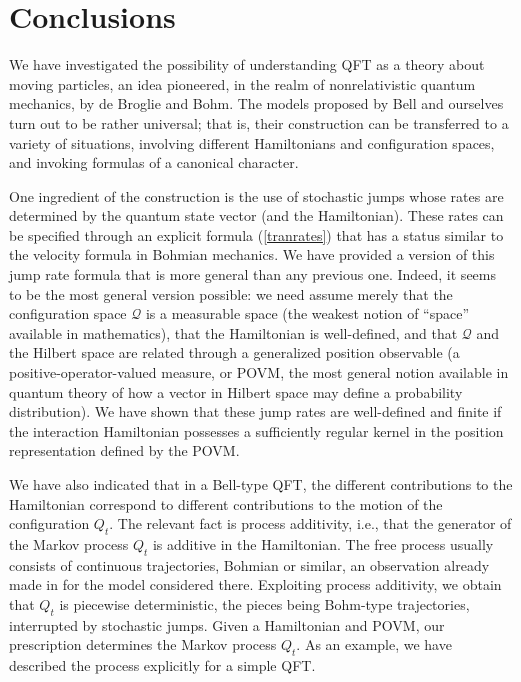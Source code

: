 \documentclass[12pt]{article}
\newcommand{\1}{\mathbf{1}} %
\newcommand{\conf}{\mathcal{Q}} %
\begin{document}
\section{Conclusions}

We have investigated the possibility of understanding QFT as a theory
about moving particles, an idea pioneered, in the realm of
nonrelativistic quantum mechanics, by de Broglie and Bohm. The models
proposed by Bell \cite{BellBeables} and ourselves \cite{crea1} turn
out to be rather universal; that is, their construction can be
transferred to a variety of situations, involving different
Hamiltonians and configuration spaces, and invoking formulas of a
canonical character.

One ingredient of the construction is the use of stochastic jumps
whose rates are determined by the quantum state vector (and the
Hamiltonian).  These rates can be specified through an explicit
formula (\ref{tranrates}) that has a status similar to the velocity
formula in Bohmian mechanics.  We have provided a version of this jump
rate formula that is more general than any previous one. Indeed, it
seems to be the most general version possible: we need assume merely
that the configuration space $\conf$ is a measurable space (the
weakest notion of ``space'' available in mathematics), that the
Hamiltonian is well-defined, and that $\conf$ and the Hilbert space
are related through a generalized position observable (a
positive-operator-valued measure, or POVM, the most general notion
available in quantum theory of how a vector in Hilbert space may
define a probability distribution). We have shown that these jump
rates are well-defined and finite if the interaction Hamiltonian
possesses a sufficiently regular kernel in the position representation
defined by the POVM.

We have also indicated that in a Bell-type QFT, the different
contributions to the Hamiltonian correspond to different contributions
to the motion of the configuration $Q_t$.  The relevant fact is
process additivity, i.e., that the generator of the Markov process
$Q_t$ is additive in the Hamiltonian.  The free process usually
consists of continuous trajectories, Bohmian or similar, an
observation already made in \cite{crea1} for the model considered
there. Exploiting process additivity, we obtain that $Q_t$ is
piecewise deterministic, the pieces being Bohm-type trajectories,
interrupted by stochastic jumps.  Given a Hamiltonian and POVM, our
prescription determines the Markov process $Q_t$. As an example, we
have described the process explicitly for a simple QFT.
\end{document}
